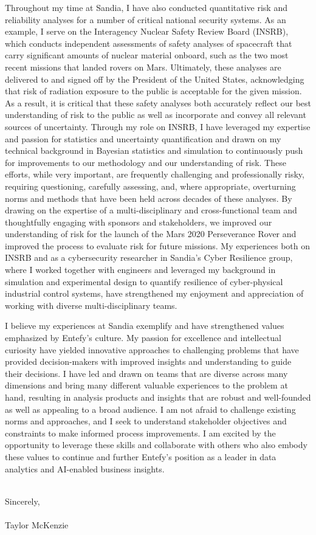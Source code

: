 \documentclass[10pt]{article}
\begin{document}
Throughout my time at Sandia, I have also conducted quantitative risk and reliability analyses for a number of critical national security systems. As an example, I serve on the Interagency Nuclear Safety Review Board (INSRB), which conducts independent assessments of safety analyses of spacecraft that carry significant amounts of nuclear material onboard, such as the two most recent missions that landed rovers on Mars. Ultimately, these analyses are delivered to and signed off by the President of the United States, acknowledging that risk of radiation exposure to the public is acceptable for the given mission. As a result, it is critical that these safety analyses both accurately reflect our best understanding of risk to the public as well as incorporate and convey all relevant sources of uncertainty. Through my role on INSRB, I have leveraged my expertise and passion for statistics and uncertainty quantification and drawn on my technical background in Bayesian statistics and simulation to continuously push for improvements to our methodology and our understanding of risk. These efforts, while very important, are frequently challenging and professionally risky, requiring questioning, carefully assessing, and, where appropriate, overturning norms and methods that have been held across decades of these analyses. By drawing on the expertise of a multi-disciplinary and cross-functional team and thoughtfully engaging with sponsors and stakeholders, we improved our understanding of risk for the launch of the Mars 2020 Perseverance Rover and improved the process to evaluate risk for future missions. My experiences both on INSRB and as a cybersecurity researcher in Sandia's Cyber Resilience group, where I worked together with engineers and leveraged my background in simulation and experimental design to quantify resilience of cyber-physical industrial control systems, have strengthened my enjoyment and appreciation of working with diverse multi-disciplinary teams.

I believe my experiences at Sandia exemplify and have strengthened values emphasized by Entefy's culture. My passion for excellence and intellectual curiosity have yielded innovative approaches to challenging problems that have provided decision-makers with improved insights and understanding to guide their decisions. I have led and drawn on teams that are diverse across many dimensions and bring many different valuable experiences to the problem at hand, resulting in analysis products and insights that are robust and well-founded as well as appealing to a broad audience. I am not afraid to challenge existing norms and approaches, and I seek to understand stakeholder objectives and constraints to make informed process improvements. I am excited by the opportunity to leverage these skills and collaborate with others who also embody these values to continue and further Entefy's position as a leader in data analytics and AI-enabled business insights.

\noindent \\Sincerely,\\\\
Taylor McKenzie
\end{document}
